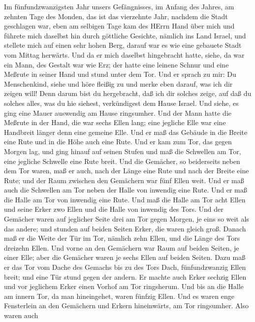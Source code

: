  Im fünfundzwanzigsten Jahr unsers Gefängnisses, im Anfang
des Jahres, am zehnten Tage des Monden, das ist das vierzehnte Jahr,
nachdem die Stadt geschlagen war, eben am selbigen Tage kam des HErrn
Hand über mich und führete mich daselbst hin  durch
göttliche Gesichte, nämlich ins Land Israel, und stellete mich auf einen
sehr hohen Berg, darauf war es wie eine gebauete Stadt vom Mittag
herwärts.  Und da er mich daselbst hingebracht hatte, siehe,
da war ein Mann, des Gestalt war wie Erz; der hatte eine leinene Schnur
und eine Meßrute in seiner Hand und stund unter dem Tor. 
Und er sprach zu mir: Du Menschenkind, siehe und höre fleißig zu und
merke eben darauf, was ich dir zeigen will! Denn darum bist du
hergebracht, daß ich dir solches zeige, auf daß du solches alles, was du
hie siehest, verkündigest dem Hause Israel.  Und siehe, es
ging eine Mauer auswendig am Hause ringsumher. Und der Mann hatte die
Meßrute in der Hand, die war sechs Ellen lang; eine jegliche Elle war
eine Handbreit länger denn eine gemeine Elle. Und er maß das Gebäude in
die Breite eine Rute und in die Höhe auch eine Rute.  Und er
kam zum Tor, das gegen Morgen lag, und ging hinauf auf seinen Stufen und
maß die Schwellen am Tor, eine jegliche Schwelle eine Rute breit.
 Und die Gemächer, so beiderseits neben dem Tor waren, maß
er auch, nach der Länge eine Rute und nach der Breite eine Rute; und der
Raum zwischen den Gemächern war fünf Ellen weit. Und er maß auch die
Schwellen am Tor neben der Halle von inwendig eine Rute. 
Und er maß die Halle am Tor von inwendig eine Rute.  Und maß
die Halle am Tor acht Ellen und seine Erker zwo Ellen und die Halle von
inwendig des Tors.  Und der Gemächer waren auf jeglicher
Seite drei am Tor gegen Morgen, je eins so weit als das andere; und
stunden auf beiden Seiten Erker, die waren gleich groß. 
Danach maß er die Weite der Tür im Tor, nämlich zehn Ellen, und die
Länge des Tors dreizehn Ellen.  Und vorne an den Gemächern
war Raum auf beiden Seiten, je einer Elle; aber die Gemächer waren je
sechs Ellen auf beiden Seiten.  Dazu maß er das Tor vom
Dache des Gemachs bis zu des Tors Dach, fünfundzwanzig Ellen breit; und
eine Tür stund gegen der andern.  Er machte auch Erker
sechzig Ellen und vor jeglichem Erker einen Vorhof am Tor ringsherum.
 Und bis an die Halle am innern Tor, da man hineingehet,
waren fünfzig Ellen.  Und es waren enge Fensterlein an den
Gemächern und Erkern hineinwärts, am Tor ringsumher. Also waren auch
